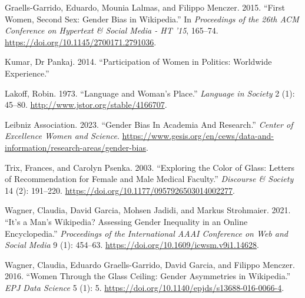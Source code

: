 \documentclass[
]{article}
\newlength{\cslhangindent}
\newlength{\cslentryspacingunit} %
\newenvironment{CSLReferences}[2] %
 {%
  \setlength{\parindent}{0pt}
  \ifodd #1
  \let\oldpar\par
  \def\par{\hangindent=\cslhangindent\oldpar}
  \fi
  \setlength{\parskip}{#2\cslentryspacingunit}
 }%
 {}
\begin{document}
\begin{CSLReferences}{1}{0}
\leavevmode{}%
Graells-Garrido, Eduardo, Mounia Lalmas, and Filippo Menczer. 2015.
{``First {Women}, {Second} {Sex}: {Gender} {Bias} in {Wikipedia}.''} In
\emph{Proceedings of the 26th {ACM} {Conference} on {Hypertext} \&
{Social} {Media} - {HT} '15}, 165--74.
\url{https://doi.org/10.1145/2700171.2791036}.

\leavevmode{}%
Kumar, Dr Pankaj. 2014. {``Participation of {Women} in {Politics}:
{Worldwide} Experience.''}

\leavevmode{}%
Lakoff, Robin. 1973. {``Language and {Woman}'s {Place}.''}
\emph{Language in Society} 2 (1): 45--80.
\url{http://www.jstor.org/stable/4166707}.

\leavevmode{}%
Leibniz Association. 2023. {``Gender {Bias} {In} {Academia} {And}
{Research}.''} \emph{Center of Excellence Women and Science}.
\url{https://www.gesis.org/en/cews/data-and-information/research-areas/gender-bias}.

\leavevmode{}%
Trix, Frances, and Carolyn Psenka. 2003. {``Exploring the {Color} of
{Glass}: {Letters} of {Recommendation} for {Female} and {Male} {Medical}
{Faculty}.''} \emph{Discourse \& Society} 14 (2): 191--220.
\url{https://doi.org/10.1177/0957926503014002277}.

\leavevmode{}%
Wagner, Claudia, David Garcia, Mohsen Jadidi, and Markus Strohmaier.
2021. {``It's a {Man}'s {Wikipedia}? {Assessing} {Gender} {Inequality}
in an {Online} {Encyclopedia}.''} \emph{Proceedings of the International
AAAI Conference on Web and Social Media} 9 (1): 454--63.
\url{https://doi.org/10.1609/icwsm.v9i1.14628}.

\leavevmode{}%
Wagner, Claudia, Eduardo Graells-Garrido, David Garcia, and Filippo
Menczer. 2016. {``Women Through the Glass Ceiling: Gender Asymmetries in
{Wikipedia}.''} \emph{EPJ Data Science} 5 (1): 5.
\url{https://doi.org/10.1140/epjds/s13688-016-0066-4}.

\end{CSLReferences}
\end{document}
